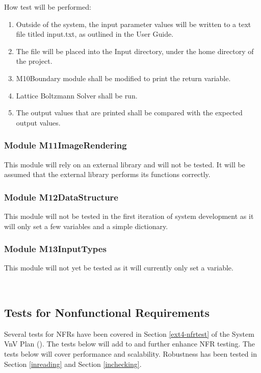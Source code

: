 \documentclass[12pt, titlepage]{article}
\newcommand{\myprogname}{Lattice Boltzmann Solver}
\begin{document}
\begin{enumerate}
	How test will be performed: 
	\begin{enumerate}
	\item Outside of the system, the input parameter values will be written to a text file titled input.txt, as outlined in the User Guide.
	\item The file will be placed into the Input directory, under the home directory of the project.
	\item M10Boundary module shall be modified to print the return variable.
	\item {\myprogname} shall be run. 
	\item The output values that are printed shall be compared with the expected output values.
	\end{enumerate}

\end{enumerate}

\subsubsection{Module M11ImageRendering}

This module will rely on an external library and will not be tested. It will be assumed that the external library performs its functions correctly.

\subsubsection{Module M12DataStructure}

This module will not be tested in the first iteration of system development as it will only set a few variables and a simple dictionary.

\subsubsection{Module M13InputTypes}

This module will not yet be tested as it will currently only set a variable.


~\newpage

\subsection{Tests for Nonfunctional Requirements}

Several tests for NFRs have been covered in Section \ref{ext4-nfrtest} of the System VnV Plan (\citet{LBM_SVNV_PM}). The tests below will add to and further enhance NFR testing. The tests below will cover performance and scalability. Robustness has been tested in Section \ref{inreading} and Section \ref{inchecking}.
\end{document}
